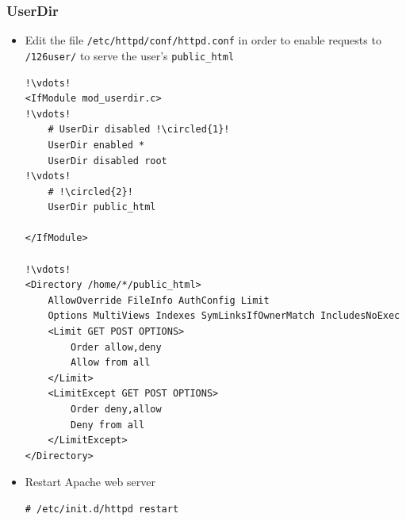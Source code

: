 \documentclass{beamer}
\newcommand*\circled[1]{\tikz[baseline=(char.base)]{
            \node[shape=circle,draw,inner sep=2pt] (char) {#1};}}
\begin{document}
\begin{frame}
\frametitle{UserDir }
\begin{itemize}
 \item Edit the file \texttt{/etc/httpd/conf/httpd.conf} in order to enable requests to \texttt{/\char126user/} to serve the user's \texttt{public\_html}



\lstset{language=shell,numbers=left}
\begin{lstlisting}[escapechar=!]
!\vdots!
<IfModule mod_userdir.c>
!\vdots!
    # UserDir disabled !\circled{1}!
    UserDir enabled *
    UserDir disabled root
!\vdots!
    # !\circled{2}!
    UserDir public_html

</IfModule>

!\vdots!
<Directory /home/*/public_html>
    AllowOverride FileInfo AuthConfig Limit
    Options MultiViews Indexes SymLinksIfOwnerMatch IncludesNoExec
    <Limit GET POST OPTIONS>
        Order allow,deny
        Allow from all
    </Limit>
    <LimitExcept GET POST OPTIONS>
        Order deny,allow
        Deny from all
    </LimitExcept>
</Directory>
\end{lstlisting}

\item Restart Apache web server

\lstset{language=shell}
\begin{lstlisting}[escapechar=&]
# /etc/init.d/httpd restart
\end{lstlisting}

\end{itemize}
\end{frame}
\end{document}
